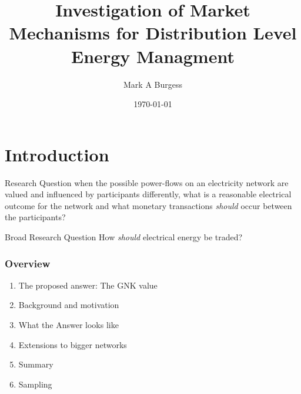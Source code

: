\documentclass{beamer}
\title[An investigation of Market Mechanisms]{Investigation of Market Mechanisms for Distribution Level Energy Managment} %
\author{Mark A Burgess} %
\institute[ANU] %
{
Australian National University \\ %
\medskip
\textit{mark.burgess@anu.edu.au} %
}
\date{\today} %
\begin{document}
\begin{frame}
\titlepage %
\end{frame}



\section{Introduction}


\begin{frame}
\begin{block}{Research Question}
when the possible power-flows on an electricity network are valued and influenced by participants differently, 
what is a reasonable electrical outcome for the network and what monetary transactions \textit{should} occur between the participants?
\end{block}
\begin{block}{Broad Research Question}
How \textit{should} electrical energy be traded?
\end{block}
\end{frame}


\begin{frame}
\frametitle{Overview}
\begin{enumerate}
\item	The proposed answer: The GNK value
\item	Background and motivation
\item	What the Answer looks like
\item	Extensions to bigger networks
\item	Summary
\item	Sampling
\end{enumerate}
\end{frame}
\end{document}
